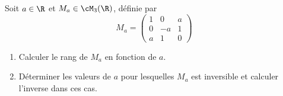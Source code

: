 



\begin{exercice}
Soit $a\in \R$ et  $M_a \in\cM_3(\R) $, définie par 
$$ M_a =\left( 
\begin{array}{ccc}
1 & 0 & a\\
0 & -a & 1\\
a & 1 & 0
\end{array}
\right)$$
\begin{enumerate}
\item  Calculer le rang de $M_a$ en fonction de $a$. 
\item Déterminer les valeurs de $a$ pour lesquelles $M_a$ est inversible et calculer l'inverse dans ces cas. 
\end{enumerate}


\end{exercice}
